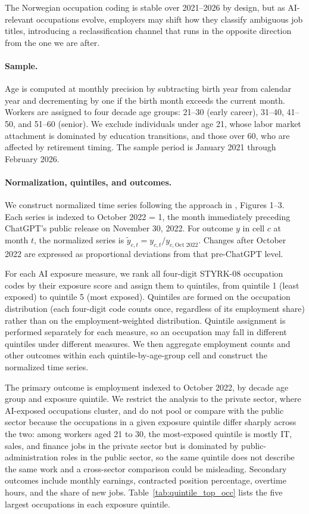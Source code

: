 \documentclass[12pt]{article}
\begin{document}
The Norwegian occupation coding is stable over 2021--2026 by design, but as AI-relevant occupations evolve, employers may shift how they classify ambiguous job titles, introducing a reclassification channel that runs in the opposite direction from the one we are after.

\paragraph{Sample.}
Age is computed at monthly precision by subtracting birth year from calendar year and decrementing by one if the birth month exceeds the current month. Workers are assigned to four decade age groups: 21--30 (early career), 31--40, 41--50, and 51--60 (senior). We exclude individuals under age 21, whose labor market attachment is dominated by education transitions, and those over 60, who are affected by retirement timing. The sample period is January 2021 through February 2026.

\paragraph{Normalization, quintiles, and outcomes.}\label{sec:data:approach}

We construct normalized time series following the approach in \citet{brynjolfsson2025}, Figures 1--3. Each series is indexed to October 2022 = 1, the month immediately preceding ChatGPT's public release on November 30, 2022. For outcome $y$ in cell $c$ at month $t$, the normalized series is $\tilde{y}_{c,t} = y_{c,t} / y_{c,\text{Oct } 2022}$. Changes after October 2022 are expressed as proportional deviations from that pre-ChatGPT level.

For each AI exposure measure, we rank all four-digit STYRK-08 occupation codes by their exposure score and assign them to quintiles, from quintile 1 (least exposed) to quintile 5 (most exposed). Quintiles are formed on the occupation distribution (each four-digit code counts once, regardless of its employment share) rather than on the employment-weighted distribution. Quintile assignment is performed separately for each measure, so an occupation may fall in different quintiles under different measures. We then aggregate employment counts and other outcomes within each quintile-by-age-group cell and construct the normalized time series.

The primary outcome is employment indexed to October 2022, by decade age group and exposure quintile. We restrict the analysis to the private sector, where AI-exposed occupations cluster, and do not pool or compare with the public sector because the occupations in a given exposure quintile differ sharply across the two: among workers aged 21 to 30, the most-exposed quintile is mostly IT, sales, and finance jobs in the private sector but is dominated by public-administration roles in the public sector, so the same quintile does not describe the same work and a cross-sector comparison could be misleading. Secondary outcomes include monthly earnings, contracted position percentage, overtime hours, and the share of new jobs. Table~\ref{tab:quintile_top_occ} lists the five largest occupations in each exposure quintile.
\end{document}
